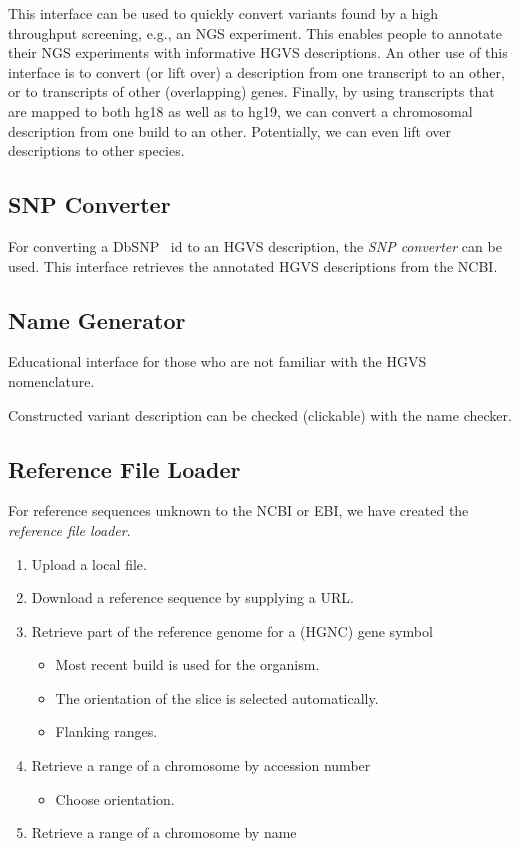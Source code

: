 \documentclass{article}
\begin{document}
This interface can be used to quickly convert variants found by a high
throughput screening, e.g., an NGS experiment. This enables people to annotate
their NGS experiments with informative HGVS descriptions. An other use of this
interface is to convert (or lift over) a description from one transcript to an
other, or to transcripts of other (overlapping) genes. Finally, by using
transcripts that are mapped to both hg18 as well as to hg19, we can convert a
chromosomal description from one build to an other. Potentially, we can even
lift over descriptions to other species.

\subsection{SNP Converter}
For converting a DbSNP~\cite{DBSNP} id to an HGVS description, the \emph{SNP
converter} can be used. This interface retrieves the annotated HGVS
descriptions from the NCBI.

\subsection{Name Generator}
Educational interface for those who are not familiar with the HGVS
nomenclature.

Constructed variant description can be checked (clickable) with the name
checker.

\subsection{Reference File Loader}
For reference sequences unknown to the NCBI or EBI, we have created the
\emph{reference file loader}.

\begin{enumerate}
  \item Upload a local file. \label{item:local}
  \item Download a reference sequence by supplying a URL.
  \item Retrieve part of the reference genome for a (HGNC) gene symbol
  \begin{itemize}
    \item Most recent build is used for the organism.
    \item The orientation of the slice is selected automatically.
    \item Flanking ranges.
  \end{itemize}
  \item Retrieve a range of a chromosome by accession number
  \begin{itemize}
    \item Choose orientation.
  \end{itemize}
  \item Retrieve a range of a chromosome by name
\end{enumerate}
\end{document}
